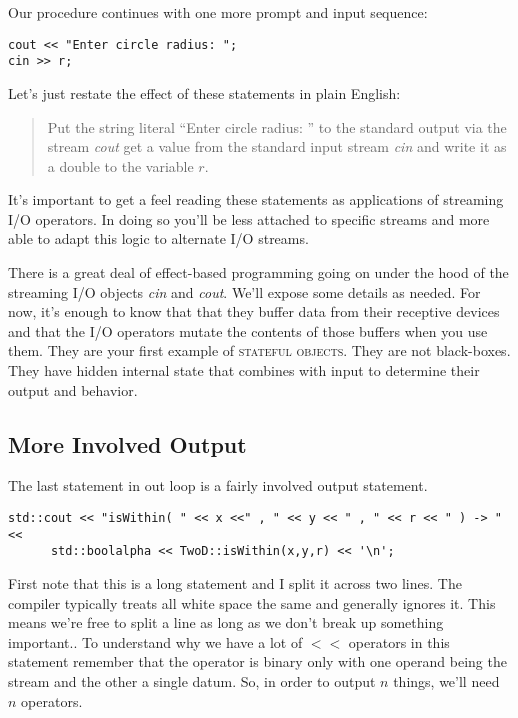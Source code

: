 \documentclass[]{tufte-handout}
\begin{document}
Our procedure continues with one more prompt and input sequence:
\begin{verbatim}
cout << "Enter circle radius: ";
cin >> r;
\end{verbatim}
Let's just restate the effect of these statements in plain English:
\begin{quote}
Put the string literal ``Enter circle radius: '' to the standard output via the stream \textit{cout} get a value from the standard input stream \textit{cin} and write it as a double to the variable $r$.
\end{quote}
It's important to get a feel reading these statements as applications of streaming I/O operators. In doing so you'll be less attached to specific streams and more able to adapt this logic to alternate I/O streams.

There is a great deal of effect-based programming going on under the hood of the streaming I/O objects \textit{cin} and \textit{cout}. We'll expose some details as needed. For now, it's enough to know that that they buffer data from their receptive devices and that the I/O operators mutate the contents of those buffers when you use them. They are your first example of \textsc{stateful objects}. They are not black-boxes. They have hidden internal state that combines with input to determine their output and behavior.

\subsection{More Involved Output}

The last statement in out loop is a fairly involved output statement.
\begin{verbatim}
std::cout << "isWithin( " << x <<" , " << y << " , " << r << " ) -> " <<
      std::boolalpha << TwoD::isWithin(x,y,r) << '\n';
\end{verbatim}

First note that this is a long statement and I split it across two lines. The compiler typically treats all white space the same and generally ignores it. This means we're free to split a line as long as we don't break up something important.. To understand why we have a lot of $<<$ operators in this statement remember that the operator is binary only with one operand being the stream and the other a single datum. So, in order to output $n$ things, we'll need $n$ operators.
\end{document}
